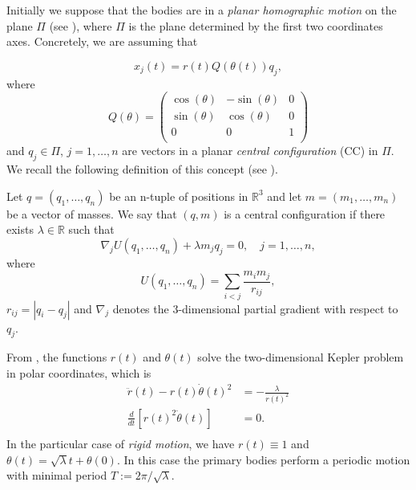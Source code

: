 \documentclass[smallcondensed]{svjour3}
\newcommand{\rr}{\mathbb{R}}
\begin{document}
Initially we suppose that the bodies are in a \emph{planar homographic motion} on the plane $\Pi$ (see \cite{JaumeLlibre276}), where  $\Pi$ is the plane determined by the first two coordinates axes. Concretely,  we are assuming  that

\begin{equation}\label{eq:x_j=rtQtq_j}
 x_j(t)=r(t)Q(\theta (t))q_j,
\end{equation}
where
\[
 Q(\theta )=\begin{pmatrix}
           \cos(\theta ) & -\sin(\theta ) & 0\\
           \sin(\theta ) & \cos(\theta ) & 0\\
           0            &     0     &  1\\
          \end{pmatrix}
\]
and $q_j\in\Pi$, $j=1,\ldots,n$ are vectors in a planar \emph{central configuration} (CC) in $\Pi$. We recall the following definition of this concept (see \cite{JaumeLlibre276}).

\begin{definition}\label{def:CC}
Let $q=(q_1,\ldots,q_n)$ be  an n-tuple of positions in $\rr^3$ and let $m=(m_1,\ldots,m_n)$ be a vector of masses. We say that $(q,m)$ is a central configuration if
there exists $\lambda\in\rr$ such that
\begin{equation}\label{eq:def.CC}
\nabla_jU(q_1,\ldots,q_n)+\lambda m_jq_j=0,\quad j=1,\ldots,n,
\end{equation}
where
\begin{equation}\label{eq:potencial}
 U(q_1,\ldots,q_n)=\sum_{i<j}\frac{m_im_j}{r_{ij}},
\end{equation}
 $r_{ij}=|q_i-q_j|$ and $\nabla_j$ denotes the $3$-dimensional partial gradient with respect to $q_j$.
\end{definition}

From \cite[Eq. (2.16)]{JaumeLlibre276},  the functions $r(t)$ and $\theta (t)$ solve the two-dimensional Kepler problem in polar coordinates, which is 
\begin{equation}
 \begin{array}{rl}\label{eq:kepler.2.dim}
\ddot{r}(t)-r(t)\dot{\theta}(t)^2 & = -\frac{\lambda}{r(t)^2}\\
\frac{d }{dt}\left[ r(t)^2\dot{\theta}(t)\right] & =0.\\
\end{array}
\end{equation}
In the particular case of \emph{rigid motion}, we have  $r(t)\equiv 1$ and $\theta (t)=\sqrt{\lambda }t +\theta(0)$. In this case the primary bodies perform a periodic motion with minimal period $T:=2\pi/\sqrt{\lambda }$.
\end{document}
